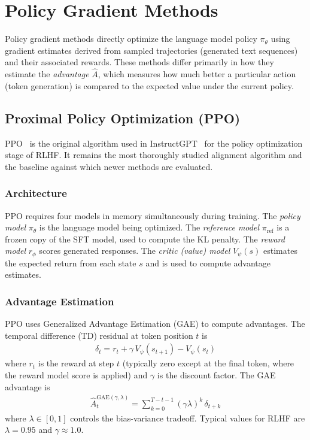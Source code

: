\documentclass[12pt]{article}
\begin{document}
\section{Policy Gradient Methods}

Policy gradient methods directly optimize the language model policy $\pi_\theta$ using gradient estimates derived from sampled trajectories (generated text sequences) and their associated rewards. These methods differ primarily in how they estimate the \textit{advantage} $\hat{A}$, which measures how much better a particular action (token generation) is compared to the expected value under the current policy.

\subsection{Proximal Policy Optimization (PPO)}

PPO~\cite{Schulman2017PPO} is the original algorithm used in InstructGPT~\cite{Ouyang2022InstructGPT} for the policy optimization stage of RLHF. It remains the most thoroughly studied alignment algorithm and the baseline against which newer methods are evaluated.

\subsubsection{Architecture}

PPO requires four models in memory simultaneously during training. The \textit{policy model} $\pi_\theta$ is the language model being optimized. The \textit{reference model} $\pi_{\text{ref}}$ is a frozen copy of the SFT model, used to compute the KL penalty. The \textit{reward model} $r_\phi$ scores generated responses. The \textit{critic (value) model} $V_\psi(s)$ estimates the expected return from each state $s$ and is used to compute advantage estimates.

\subsubsection{Advantage Estimation}

PPO uses Generalized Advantage Estimation (GAE) to compute advantages. The temporal difference (TD) residual at token position $t$ is
\begin{align}
\delta_t = r_t + \gamma \, V_\psi(s_{t+1}) - V_\psi(s_t)
\end{align}
where $r_t$ is the reward at step $t$ (typically zero except at the final token, where the reward model score is applied) and $\gamma$ is the discount factor. The GAE advantage is
\begin{align}
\hat{A}_t^{\text{GAE}(\gamma, \lambda)} = \sum_{k=0}^{T-t-1} (\gamma \lambda)^k \, \delta_{t+k}
\end{align}
where $\lambda \in [0,1]$ controls the bias-variance tradeoff. Typical values for RLHF are $\lambda = 0.95$ and $\gamma \approx 1.0$.
\end{document}
